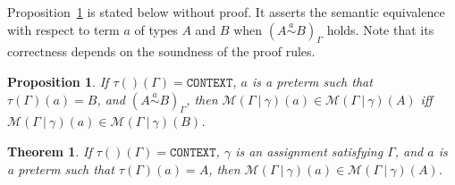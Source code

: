 \documentclass [12pt,twoside]{cslreport}
\newtheorem{prop}[thm]{Proposition}
\newcommand{\tauGamma}[1]{\tau(\Gamma)(#1)}
\newcommand{\Mgamma}[1]{{\mathcal M}(\Gamma\vbar\gamma)(#1)}
\newcommand{\ttcontext}{\mathtt{CONTEXT}}
\newcommand{\vbar}{\ |\ }
\newcommand{\sima}{\stackrel{a}{\sim}} %
\newtheorem{theorem}{Theorem}
\begin{document}
Proposition~\ref{substitution-equivalence} is stated below without proof.
It asserts the semantic equivalence with respect to term $a$
of types $A$ and $B$ when $(A\sima B)_\Gamma$ holds.   Note that its
correctness depends on the soundness of the proof rules.  

\begin{prop}\label{substitution-equivalence}
If $\tau()(\Gamma) = \ttcontext$,  $a$ is a preterm such that
$\tauGamma{a} = B$, and $(A\sima  B)_\Gamma$,
then $\Mgamma{a}\in \Mgamma{A}$ iff $\Mgamma{a}\in \Mgamma{B}$\@.  
\begin{comment}
\begin{enumerate}
\item $\Mgamma{a}\in \Mgamma{A}$ iff $\Mgamma{a}\in \Mgamma{a/A}$
\item $\vdash \pi(a/A)(a)$ iff $\vdash \pi(A)(a)$\@.
\end{enumerate}
\end{comment}
\end{prop}
%
\begin{theorem}\label{dependent-term-semantics}
If $\tau()(\Gamma) = \ttcontext$, $\gamma$ is an assignment satisfying
$\Gamma$, and $a$ is a preterm such that $\tauGamma{a} = A$, then
$\Mgamma{a}\in \Mgamma{A}$\@.   
\end{theorem}
\end{document}

